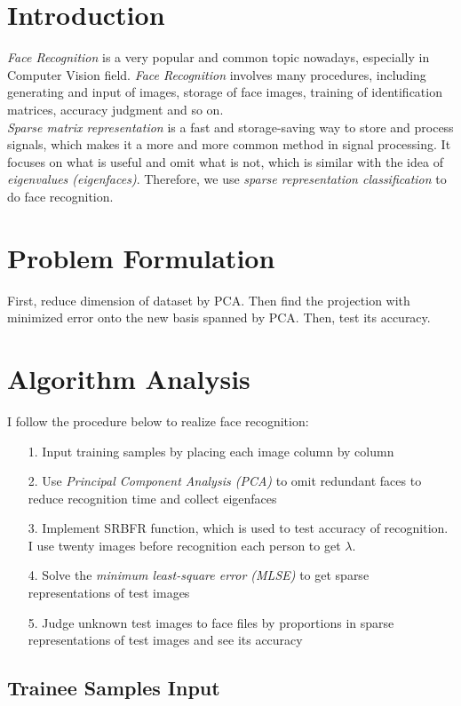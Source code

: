 \section{Introduction}

\emph{Face Recognition} is a very popular and common topic nowadays, especially in Computer Vision field. \emph{Face Recognition} involves many procedures, including generating and input of images, storage of face images, training of identification matrices, accuracy judgment and so on. 
\\
\emph{Sparse matrix representation} is a fast and storage-saving way to store and process signals, which makes it a more and more common method in signal processing. It focuses on what is useful and omit what is not, which is similar with the idea of \emph{eigenvalues (eigenfaces)}. Therefore, we use \emph{sparse representation classification} to do face recognition.

\section{Problem Formulation}
First, reduce dimension of dataset by PCA. Then find the projection with minimized error onto the new basis spanned by PCA. Then, test its accuracy.

\section{Algorithm Analysis}
I follow the procedure below to realize face recognition:
\begin{itemize}
	\item[1. ] Input training samples by placing each image column by column
	\item[2. ] Use \emph{Principal Component Analysis (PCA)} to omit redundant faces to reduce recognition time and collect eigenfaces
	\item[3. ] Implement SRBFR function, which is used to test accuracy of recognition. I use twenty images before recognition each person to get \(\lambda\).
	\item[4. ] Solve the \emph{minimum least-square error (MLSE)} to get sparse representations of test images
	\item[5. ] Judge unknown test images to face files by proportions in sparse representations of test images and see its accuracy
\end{itemize}

\subsection{Trainee Samples Input}

